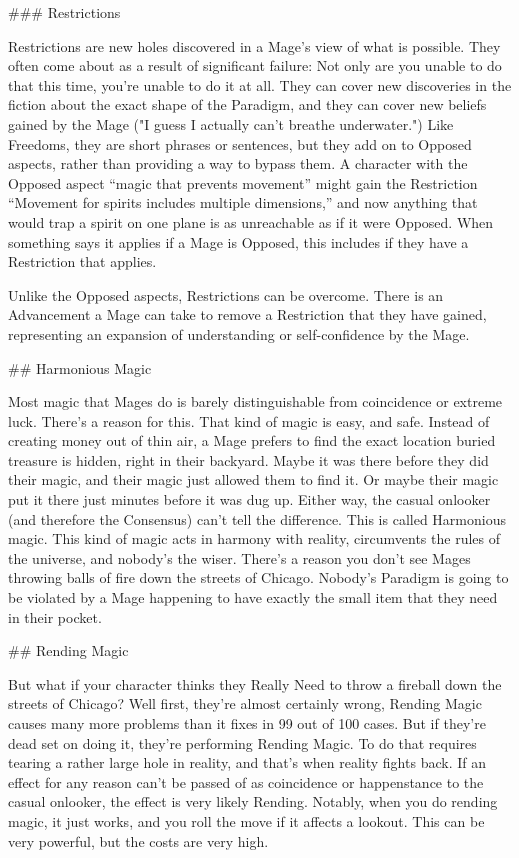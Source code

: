 \documentclass[
  oneside,
  statementpaper,
  9pt]{memoir}
\begin{document}
\begin{Player}
### Restrictions

Restrictions are new holes discovered in a Mage’s view of what is possible. They often come about as a result of significant failure: Not only are you unable to do that this time, you’re unable to do it at all. They can cover new discoveries in the fiction about the exact shape of the Paradigm, and they can cover new beliefs gained by the Mage ("I guess I actually can’t breathe underwater.") Like Freedoms, they are short phrases or sentences, but they add on to Opposed aspects, rather than providing a way to bypass them. A character with the Opposed aspect “magic that prevents movement” might gain the Restriction “Movement for spirits includes multiple dimensions,” and now anything that would trap a spirit on one plane is as unreachable as if it were Opposed. When something says it applies if a Mage is Opposed, this includes if they have a Restriction that applies.

Unlike the Opposed aspects, Restrictions can be overcome. There is an Advancement a Mage can take to remove a Restriction that they have gained, representing an expansion of understanding or self-confidence by the Mage.

## Harmonious Magic

Most magic that Mages do is barely distinguishable from coincidence or extreme luck. There’s a reason for this. That kind of magic is easy, and safe. Instead of creating money out of thin air, a Mage prefers to find the exact location buried treasure is hidden, right in their backyard. Maybe it was there before they did their magic, and their magic just allowed them to find it. Or maybe their magic put it there just minutes before it was dug up. Either way, the casual onlooker (and therefore the Consensus) can’t tell the difference. This is called Harmonious magic. This kind of magic acts in harmony with reality, circumvents the rules of the universe, and nobody’s the wiser. There’s a reason you don’t see Mages throwing balls of fire down the streets of Chicago. Nobody’s Paradigm is going to be violated by a Mage happening to have exactly the small item that they need in their pocket.

## Rending Magic

But what if your character thinks they Really Need to throw a fireball down the streets of Chicago? Well first, they’re almost certainly wrong, Rending Magic causes many more problems than it fixes in 99 out of 100 cases. But if they’re dead set on doing it, they’re performing Rending Magic. To do that requires tearing a rather large hole in reality, and that’s when reality fights back. If an effect for any reason can’t be passed of as coincidence or happenstance to the casual onlooker, the effect is very likely Rending. Notably, when you do rending magic, it just works, and you roll the move if it affects a lookout. This can be very powerful, but the costs are very high.


\end{Player}
\end{document}
